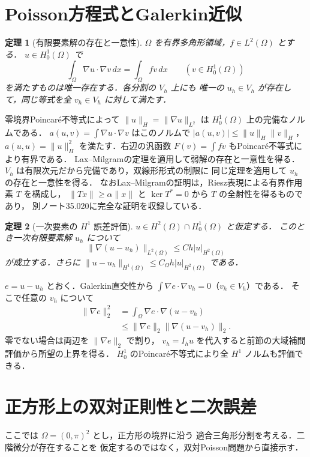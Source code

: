 \documentclass[a5paper,10pt,onecolumn]{jsarticle}
\makeatletter
\theoremstyle{mathnotetheorem}
\newtheorem{theorem}{定理}[section]
\renewcommand{\proofname}{証明}
\renewenvironment{proof}[1][\proofname]{%
  \par\pushQED{\qed}\normalfont\topsep4\p@\@plus2\p@\relax
  \trivlist\item[\hskip\labelsep\bfseries #1]\ignorespaces
}{\popQED\endtrivlist\@endpefalse}
\newcommand{\norm}[1]{\lVert #1\rVert}
\makeatother
\begin{document}
\section{Poisson方程式とGalerkin近似}
\begin{theorem}[有限要素解の存在と一意性]
$\Omega$ を有界多角形領域，$f\in L^2(\Omega)$ とする．
$u\in H_0^1(\Omega)$ で
\[
  \int_\Omega\nabla u\cdot\nabla v\,dx
       =\int_\Omega fv\,dx\qquad(v\in H_0^1(\Omega))
\]
を満たすものは唯一存在する．各分割の $V_h$ 上にも
唯一の $u_h\in V_h$ が存在して，同じ等式を全 $v_h\in V_h$ に対して満たす．
\end{theorem}
\begin{proof}
零境界Poincar\'e不等式によって
$\norm u_{H}=\norm{\nabla u}_{L^2}$ は
$H_0^1(\Omega)$ 上の完備なノルムである．
$a(u,v)=\int\nabla u\cdot\nabla v$ はこのノルムで
$|a(u,v)|\le\norm u_H\norm v_H$，$a(u,u)=\norm u_H^2$
を満たす．右辺の汎函数
$F(v)=\int fv$ もPoincar\'e不等式により有界である．
Lax--Milgramの定理を適用して弱解の存在と一意性を得る．
$V_h$ は有限次元だから完備であり，双線形形式の制限に
同じ定理を適用して $u_h$ の存在と一意性を得る．
なおLax--Milgramの証明は，Riesz表現による有界作用素 $T$ を構成し，
$\norm{Tx}\ge\alpha\norm x$ と
$\ker T^*=0$ から $T$ の全射性を得るものであり，
別ノート35.020に完全な証明を収録している．
\end{proof}

\begin{theorem}[一次要素の $H^1$ 誤差評価]
$u\in H^2(\Omega)\cap H_0^1(\Omega)$ と仮定する．
このとき一次有限要素解 $u_h$ について
\[
 \norm{\nabla(u-u_h)}_{L^2(\Omega)}
 \le Ch|u|_{H^2(\Omega)}
\]
が成立する．さらに $\norm{u-u_h}_{H^1(\Omega)}\le
C_\Omega h|u|_{H^2(\Omega)}$ である．
\end{theorem}
\begin{proof}
$e=u-u_h$ とおく．Galerkin直交性から
$\int\nabla e\cdot\nabla v_h=0$（$v_h\in V_h$）である．
そこで任意の $v_h$ について
\[
 \begin{aligned}
 \norm{\nabla e}_2^2
 &=\int_\Omega\nabla e\cdot\nabla(u-v_h)\\
 &\le\norm{\nabla e}_2\norm{\nabla(u-v_h)}_2.
 \end{aligned}
\]
零でない場合は両辺を $\norm{\nabla e}_2$ で割り，
$v_h=I_hu$ を代入すると前節の大域補間評価から所望の上界を得る．
$H_0^1$ のPoincar\'e不等式により全 $H^1$ ノルムも評価できる．
\end{proof}

\section{正方形上の双対正則性と二次誤差}
ここでは $\Omega=(0,\pi)^2$ とし，正方形の境界に沿う
適合三角形分割を考える．二階微分が存在することを
仮定するのではなく，双対Poisson問題から直接示す．
\end{document}
